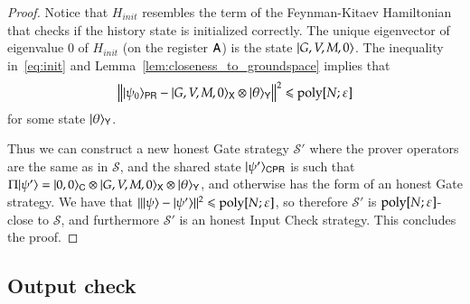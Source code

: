 \begin{proof}
	Notice that $H_{init}$ resembles the term of the Feynman-Kitaev Hamiltonian that checks if the history state is initialized correctly. The unique eigenvector of eigenvalue $0$ of $H_{init}$ (on the register ${\mathsf{A}}$) is the state $|G,V,M,0\rangle$. The inequality in~\eqref{eq:init} and Lemma~\ref{lem:closeness_to_groundspace} implies that
	\[
		\left\lVert |\psi_0\rangle_{{\mathsf{P}} {\mathsf{R}}} - |G,V,M,0\rangle_{{\mathsf{X}}} \otimes |\theta\rangle_{{\mathsf{Y}}} \right\rVert^2 \leqslant \operatorname{poly}[N;\varepsilon]
	\]
	for some state $|\theta\rangle_{{\mathsf{Y}}}$.
	
	Thus we can construct a new honest Gate strategy $\mathcal{S}'$ where the prover operators are the same as in $\mathcal{S}$, and the shared state $|\psi'\rangle_{{\mathsf{C}} {\mathsf{P}} {\mathsf{R}}}$ is such that $\Pi |\psi'\rangle = |0,0\rangle_{{\mathsf{C}}} \otimes |G,V,M,0\rangle_{{\mathsf{X}}} \otimes |\theta\rangle_{{\mathsf{Y}}}$, and otherwise has the form of an honest Gate strategy. We have that $\| |\psi\rangle - |\psi'\rangle \|^2 \leqslant \operatorname{poly}[N;\varepsilon]$, so therefore $\mathcal{S}'$ is $\operatorname{poly}[N;\varepsilon]$-close to $\mathcal{S}$, and furthermore $\mathcal{S}'$ is an honest Input Check strategy. This concludes the proof.
	

	

\end{proof}

\subsection{Output check}
\label{sec:output_check}


